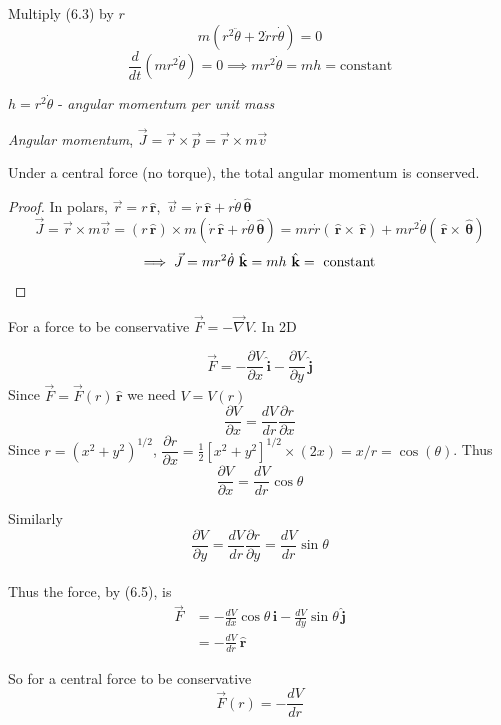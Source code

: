 \documentclass[twoside]{scrartcl}
\let\oldhat\hat
\renewcommand{\hat}[1]{\,\oldhat{\boldsymbol{\mathbf{#1}}}}
\begin{document}
Multiply (6.3) by $r$
\[m(r^2\ddot{\theta} + 2\dot{r}r\dot{\theta}) = 0\]
\[\frac{d}{dt}(mr^2\dot{\theta}) = 0 \implies mr^2\dot{\theta} = mh = \text{constant}\]
\begin{definition}
$h = r^2\dot{\theta}$ - \emph{angular momentum per unit mass}

\emph{Angular momentum}, $\vec{J} = \vec{r} \times \vec{p} = \vec{r} \times m \vec{v}$
\end{definition}
\begin{theorem}
	Under a central force (no torque), the total angular momentum is conserved.
\end{theorem}

\begin{proof}
In polars, $\vec{r} = r\hat{r}$,~$\vec{v} = \dot{r}\hat{r} + r\dot{\theta}\hat{\theta}$
\[\vec{J} = \vec{r} \times m\vec{v} = (r\hat{r}) \times m(\dot{r}\hat{r} + r\dot{\theta}\hat{\theta}) = mr\dot{r}(\hat{r}\times\hat{r}) + mr^2\dot{\theta}(\hat{r} \times \hat{\theta}) \]
\[\implies \vec{J} =  mr^2\dot{\theta}\hat{k} = mh\hat{k} = \text{ constant }\qedhere\]
\end{proof}



For a force to be conservative $\vec{F} = -\vec{\nabla}V$. In 2D

\begin{equation}\vec{F} = -\frac{\partial V}{\partial x}\hat{i} - \frac{\partial V}{\partial y}\hat{j}\end{equation}
Since $\vec{F} = \vec{F}(r)\hat{r}$ we need $V = V(r)$
\[\frac{\partial V}{\partial x} = \frac{dV}{dr}\frac{\partial r}{\partial x}\]
Since $r = (x^2 + y^2)^{1/2}$, $\dfrac{\partial r}{\partial x} = \frac{1}{2}[x^2 + y^2]^{1/2}\times(2x) = x/r = \cos(\theta)$.
Thus 
\[\frac{\partial V}{\partial x} = \frac{dV}{dr}\cos\theta\]

Similarly \[\frac{\partial V}{\partial y} = \frac{dV}{dr}\frac{\partial r}{\partial y} = \frac{dV}{dr}\sin\theta\]~\\

Thus the force, by (6.5), is
\[\begin{aligned}\vec{F} &= -\frac{dV}{dx}\cos\theta\hat{i} - \frac{dV}{dy}\sin\theta\hat{j}\\
 &= -\frac{dV}{dr}\hat{r}
\end{aligned}
\]

So for a central force to be conservative
\[\vec{F}(r) = -\frac{dV}{dr}\]
\end{document}
